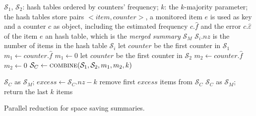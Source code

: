 \documentclass[final,3p,times]{elsarticle}
\begin{document}
\begin{algorithm}
\begin{algorithmic}[1]
\Require $\mathcal{S}_1$, $\mathcal{S}_2$: hash tables ordered by counters' frequency; $k$: the $k$-majority parameter; 
	the hash tables store pairs $<item, counter>$, a monitored item $e$ is used as key and a counter $c$ as object, including the estimated frequency $c.\hat{f}$ and the error $c.\hat{\varepsilon}$ of the item $e$
\Ensure an hash table, which is the \textit{merged summary} $\mathcal{S}_M$
        \Comment $\mathcal{S}_i.nz$ is the number of items in the hash table $\mathcal{S}_i$
		\State let $counter$ be the first counter in $\mathcal{S}_1$
		\State $m_1 \leftarrow counter.\hat{f}$
	\Else
		\State $m_1 \leftarrow 0$
	\EndIf
		\State let $counter$ be the first counter in $\mathcal{S}_2$
		\State $m_2 \leftarrow counter.\hat{f}$
	\Else
		\State $m_2 \leftarrow 0$
	\EndIf
\State $\mathcal{S}_C \leftarrow \Call{combine}{\mathcal{S}_1, \mathcal{S}_2, m_1, m_2, k}$

	\State \Return $\mathcal{S}_C$ as $\mathcal{S}_M$;
\Else 
	\State $excess \leftarrow \mathcal{S}_C.nz - k$
	\State remove first $excess$ items from $\mathcal{S}_C$
	\State \Return $\mathcal{S}_C$ as $\mathcal{S}_M$; \Comment return the last $k$ items
\EndIf

\EndProcedure
\caption{Parallel reduction for space saving summaries.}
\label{pssr}
\end{algorithmic}
\end{algorithm}
\end{document}
